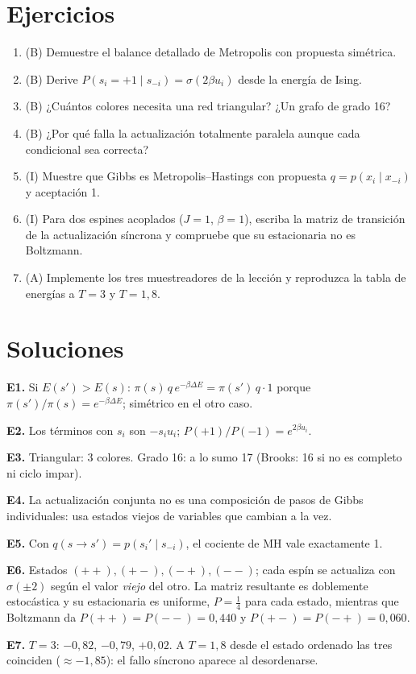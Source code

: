 \documentclass[11pt,a4paper]{article}
\begin{document}
\section{Ejercicios}
\begin{enumerate}[label=\textbf{E\arabic*.}]
\item (B) Demuestre el balance detallado de Metropolis con propuesta simétrica.
\item (B) Derive $P(s_i=+1\mid s_{-i})=\sigma(2\beta u_i)$ desde la energía de Ising.
\item (B) ¿Cuántos colores necesita una red triangular? ¿Un grafo de grado 16?
\item (B) ¿Por qué falla la actualización totalmente paralela aunque cada condicional sea correcta?
\item (I) Muestre que Gibbs es Metropolis--Hastings con propuesta $q=p(x_i\mid x_{-i})$ y aceptación 1.
\item (I) Para dos espines acoplados ($J=1$, $\beta=1$), escriba la matriz de transición de la actualización síncrona y compruebe que su
estacionaria no es Boltzmann.
\item (A) Implemente los tres muestreadores de la lección y reproduzca la tabla de energías a $T=3$ y $T=1{,}8$.
\end{enumerate}
\section{Soluciones}
\begin{solucion}
\textbf{E1.} Si $E(s')>E(s)$: $\pi(s)\,q\,e^{-\beta\Delta E}=\pi(s')\,q\cdot1$ porque $\pi(s')/\pi(s)=e^{-\beta\Delta E}$; simétrico en el otro caso.

\textbf{E2.} Los términos con $s_i$ son $-s_iu_i$; $P(+1)/P(-1)=e^{2\beta u_i}$.

\textbf{E3.} Triangular: 3 colores. Grado 16: a lo sumo 17 (Brooks: 16 si no es completo ni ciclo impar).

\textbf{E4.} La actualización conjunta no es una composición de pasos de Gibbs individuales: usa estados viejos de variables que cambian a la vez.

\textbf{E5.} Con $q(s\to s')=p(s_i'\mid s_{-i})$, el cociente de MH vale exactamente 1.

\textbf{E6.} Estados $(++),(+-),(-+),(--)$; cada espín se actualiza con $\sigma(\pm2)$ según el valor \emph{viejo} del otro. La matriz
resultante es doblemente estocástica y su estacionaria es uniforme, $P=\tfrac14$ para cada estado, mientras que Boltzmann da
$P(++)=P(--)=0{,}440$ y $P(+-)=P(-+)=0{,}060$.

\textbf{E7.} $T=3$: $-0{,}82$, $-0{,}79$, $+0{,}02$. A $T=1{,}8$ desde el estado ordenado las tres coinciden ($\approx-1{,}85$): el fallo síncrono
aparece al desordenarse.
\end{solucion}
\end{document}
